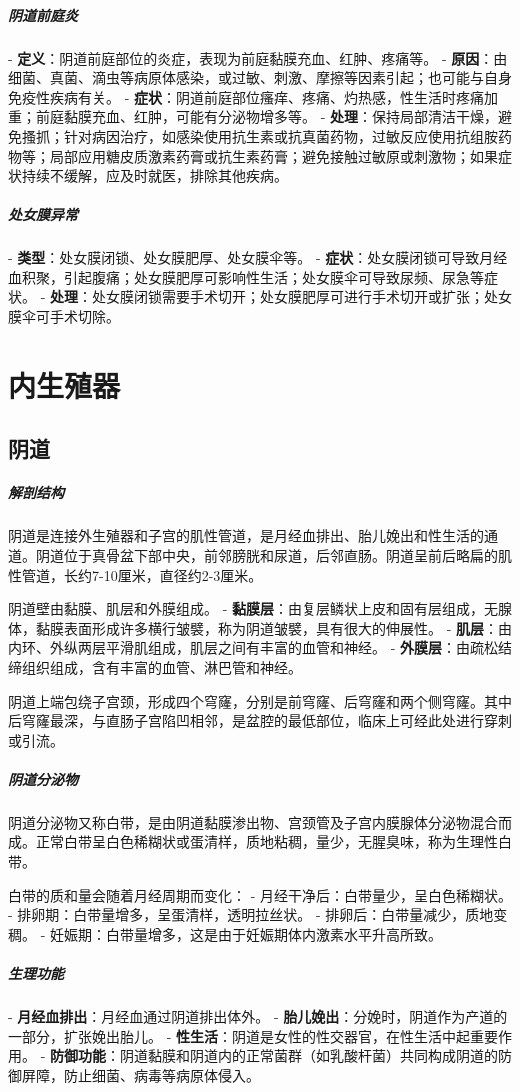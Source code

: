 \begin{enumerate}
\subparagraph{阴道前庭炎}
- \textbf{定义}：阴道前庭部位的炎症，表现为前庭黏膜充血、红肿、疼痛等。
- \textbf{原因}：由细菌、真菌、滴虫等病原体感染，或过敏、刺激、摩擦等因素引起；也可能与自身免疫性疾病有关。
- \textbf{症状}：阴道前庭部位瘙痒、疼痛、灼热感，性生活时疼痛加重；前庭黏膜充血、红肿，可能有分泌物增多等。
- \textbf{处理}：保持局部清洁干燥，避免搔抓；针对病因治疗，如感染使用抗生素或抗真菌药物，过敏反应使用抗组胺药物等；局部应用糖皮质激素药膏或抗生素药膏；避免接触过敏原或刺激物；如果症状持续不缓解，应及时就医，排除其他疾病。

\subparagraph{处女膜异常}
- \textbf{类型}：处女膜闭锁、处女膜肥厚、处女膜伞等。
- \textbf{症状}：处女膜闭锁可导致月经血积聚，引起腹痛；处女膜肥厚可影响性生活；处女膜伞可导致尿频、尿急等症状。
- \textbf{处理}：处女膜闭锁需要手术切开；处女膜肥厚可进行手术切开或扩张；处女膜伞可手术切除。

\section{内生殖器}

\subsection{阴道}

\subparagraph{解剖结构}
阴道是连接外生殖器和子宫的肌性管道，是月经血排出、胎儿娩出和性生活的通道。阴道位于真骨盆下部中央，前邻膀胱和尿道，后邻直肠。阴道呈前后略扁的肌性管道，长约7-10厘米，直径约2-3厘米。

阴道壁由黏膜、肌层和外膜组成。
- \textbf{黏膜层}：由复层鳞状上皮和固有层组成，无腺体，黏膜表面形成许多横行皱襞，称为阴道皱襞，具有很大的伸展性。
- \textbf{肌层}：由内环、外纵两层平滑肌组成，肌层之间有丰富的血管和神经。
- \textbf{外膜层}：由疏松结缔组织组成，含有丰富的血管、淋巴管和神经。

阴道上端包绕子宫颈，形成四个穹窿，分别是前穹窿、后穹窿和两个侧穹窿。其中后穹窿最深，与直肠子宫陷凹相邻，是盆腔的最低部位，临床上可经此处进行穿刺或引流。

\subparagraph{阴道分泌物}
阴道分泌物又称白带，是由阴道黏膜渗出物、宫颈管及子宫内膜腺体分泌物混合而成。正常白带呈白色稀糊状或蛋清样，质地粘稠，量少，无腥臭味，称为生理性白带。

白带的质和量会随着月经周期而变化：
- 月经干净后：白带量少，呈白色稀糊状。
- 排卵期：白带量增多，呈蛋清样，透明拉丝状。
- 排卵后：白带量减少，质地变稠。
- 妊娠期：白带量增多，这是由于妊娠期体内激素水平升高所致。

\subparagraph{生理功能}
- \textbf{月经血排出}：月经血通过阴道排出体外。
- \textbf{胎儿娩出}：分娩时，阴道作为产道的一部分，扩张娩出胎儿。
- \textbf{性生活}：阴道是女性的性交器官，在性生活中起重要作用。
- \textbf{防御功能}：阴道黏膜和阴道内的正常菌群（如乳酸杆菌）共同构成阴道的防御屏障，防止细菌、病毒等病原体侵入。


\end{enumerate}
